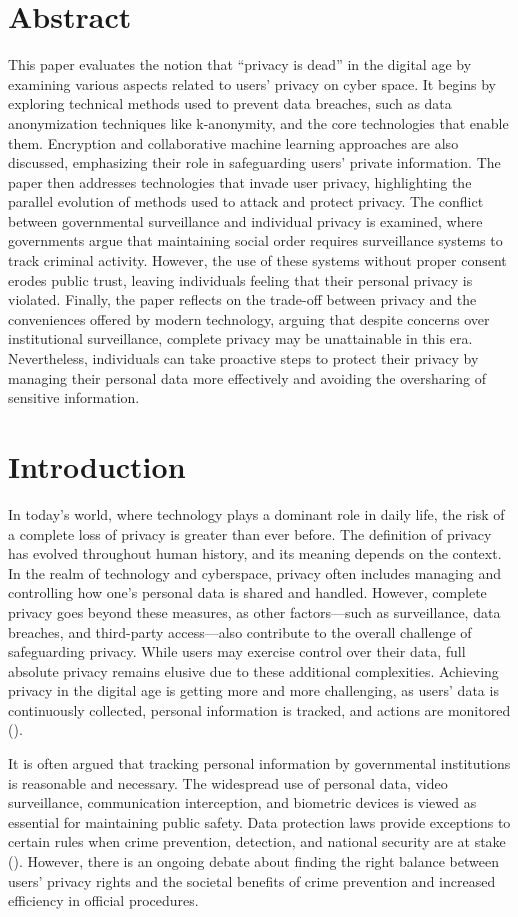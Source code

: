 \documentclass[a4paper,12pt]{article}
\newcommand{\abstractpage}{
  \newpage
  \section*{Abstract}
  \doublespacing
  
  \singlespacing
}
\newcommand{\tocpage}{
  \newpage
  \tableofcontents
  \newpage
}
\newcommand{\sectionpage}[1]{
  \newpage
  \section{#1}
  \doublespacing
  \singlespacing
}
\begin{document}
\abstractpage
\onehalfspacing
This paper evaluates the notion that “privacy is dead” in the digital age by examining various aspects related to users’ privacy on cyber space. It begins by exploring technical methods used to prevent data breaches, such as data anonymization techniques like k-anonymity, and the core technologies that enable them. Encryption and collaborative machine learning approaches are also discussed, emphasizing their role in safeguarding users' private information. The paper then addresses technologies that invade user privacy, highlighting the parallel evolution of methods used to attack and protect privacy. The conflict between governmental surveillance and individual privacy is examined, where governments argue that maintaining social order requires surveillance systems to track criminal activity. However, the use of these systems without proper consent erodes public trust, leaving individuals feeling that their personal privacy is violated. Finally, the paper reflects on the trade-off between privacy and the conveniences offered by modern technology, arguing that despite concerns over institutional surveillance, complete privacy may be unattainable in this era. Nevertheless, individuals can take proactive steps to protect their privacy by managing their personal data more effectively and avoiding the oversharing of sensitive information.

\tocpage

\sectionpage{Introduction}
\onehalfspacing
In today’s world, where technology plays a dominant role in daily life, the risk of a complete loss of privacy is greater than ever before. The definition of privacy has evolved throughout human history, and its meaning depends on the context. In the realm of technology and cyberspace, privacy often includes managing and controlling how one’s personal data is shared and handled. However, complete privacy goes beyond these measures, as other factors—such as surveillance, data breaches, and third-party access—also contribute to the overall challenge of safeguarding privacy. While users may exercise control over their data, full absolute privacy remains elusive due to these additional complexities. Achieving privacy in the digital age is getting more and more challenging, as users’ data is continuously collected, personal information is tracked, and actions are monitored (\cite{raab2012surveillance}).

It is often argued that tracking personal information by governmental institutions is reasonable and necessary. The widespread use of personal data, video surveillance, communication interception, and biometric devices is viewed as essential for maintaining public safety. Data protection laws provide exceptions to certain rules when crime prevention, detection, and national security are at stake (\cite{raab2012surveillance}). However, there is an ongoing debate about finding the right balance between users' privacy rights and the societal benefits of crime prevention and increased efficiency in official procedures. 
\end{document}

